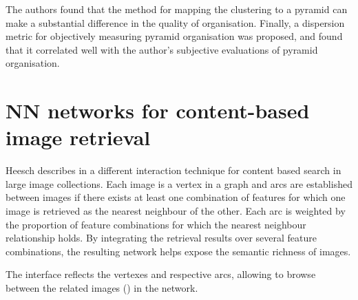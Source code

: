 The authors found that the method for mapping the clustering to a pyramid can make a substantial difference in the quality of organisation. Finally, a dispersion metric for objectively measuring pyramid organisation was proposed, and found that it correlated well with the author's subjective evaluations of pyramid organisation.


\newpage
\section{NN networks for content-based image retrieval} %
\label{sub:Heesch}

Heesch describes in \cite{Heesch:2004p2675} a different interaction technique for content based search in large image collections. Each image is a vertex in a graph and arcs are established between images if there exists at least one combination of features for which one image is retrieved as the nearest neighbour of the other. Each arc is weighted by the proportion of feature combinations for which the nearest neighbour relationship holds. By integrating the retrieval results over several feature combinations, the resulting network helps expose the semantic richness of images.

The interface reflects the vertexes and respective arcs, allowing to browse between the related images () in the network.

